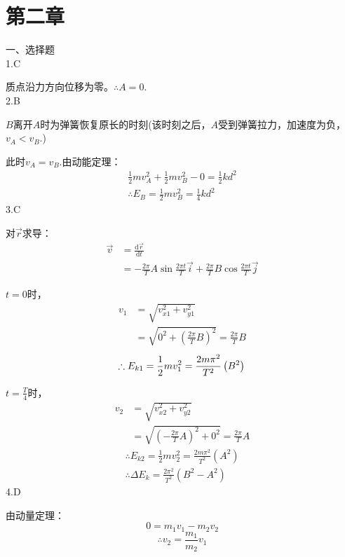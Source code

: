 \documentclass[a4paper,fleqn,twocolumn]{article}
\newcommand{\di}[1]{\mathrm{d}#1}
\begin{document}
\section*{第二章}
    一、选择题\\
        1.C\par
        质点沿力方向位移为零。$\therefore A=0$.\\
        2.B\par
        $B$离开$A$时为弹簧恢复原长的时刻(该时刻之后，$A$受到弹簧拉力，加速度为负，$v_A<v_B$.)\par
        此时$v_A=v_B$.由动能定理：
        \begin{align*}
            \frac{1}{2}mv_A^2+\frac{1}{2}mv_B^2-0=\frac{1}{2}kd^2\\
            \therefore{}E_B=\frac{1}{2}mv_B^2=\frac{1}{4}kd^2
        \end{align*}
        3.C\par
        对$\vec{r}$求导：
        \begin{align*}
            \vec{v}&=\frac{\di{\vec{r}}}{\di{t}}\\
            &=-\frac{2\pi}{T}A\sin\frac{2\pi t}{T}\vec{i}+\frac{2\pi}{T}B\cos\frac{2\pi t}{T}\vec{j}
        \end{align*}
        \par$t=0$时，
        \begin{align*}
            v_1&=\sqrt{v_{x1}^2+v_{y1}^2}\\
            &=\sqrt{0^2+\left(\frac{2\pi}{T}B\right)^2}=\frac{2\pi}{T}B
        \end{align*}
        \[\therefore{}E_{k1}=\frac{1}{2}mv_1^2=\frac{2m\pi^2}{T^2}\left(B^2\right)\\\]
        \par$t=\frac{T}{4}$时，
        \begin{align*}
            v_2&=\sqrt{v_{x2}^2+v_{y2}^2}\\
            &=\sqrt{\left(-\frac{2\pi}{T}A\right)^2+0^2}=\frac{2\pi}{T}A
        \end{align*}
        \begin{gather*}
            \therefore{}E_{k2}=\frac{1}{2}mv_2^2=\frac{2m\pi^2}{T^2}\left(A^2\right)\\
            \therefore\Delta{}E_k=\frac{2\pi^2}{T^2}(B^2-A^2)
        \end{gather*}
        4.D\par
        由动量定理：
        \[0=m_1v_1-m_2v_2\]
        \[\therefore{}v_2=\frac{m_1}{m_2}v_1\]\par
\end{document}
